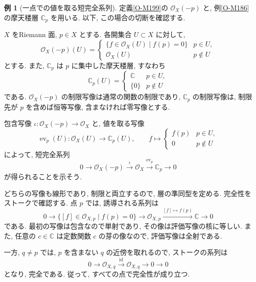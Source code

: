 \documentclass[dvipdfmx,a4paper,11pt]{article} %
\newcommand{\C}{\mathbb{C}}
\theoremstyle{definition}
\numberwithin{equation}{section}
\newtheorem{exa}[thm]{例}
\begin{document}
\begin{exa}[一点での値を取る短完全系列]\label{exa-evaluation-sequence}
定義\ref{O-M199}の $\mathcal O_X(-p)$ と, 例\ref{O-M186}の摩天楼層 $\C_p$ を用いる. 以下, この場合の切断を確認する.

$X$ をRiemann 面, $p\in X$ とする.
各開集合 $U\subset X$ に対して, 
\[
\mathcal O_X(-p)(U)=
\begin{cases}
\{f\in\mathcal O_X(U)\mid f(p)=0\} & p\in U,\\
\mathcal O_X(U) & p\notin U
\end{cases}
\]
とする.
また, $\C_p$ は $p$ に集中した摩天楼層, すなわち
\[
\C_p(U)=
\begin{cases}
\C & p\in U,\\
\{0\} & p\notin U
\end{cases}
\]
である.
$\mathcal O_X(-p)$ の制限写像は通常の関数の制限であり, 
$\C_p$ の制限写像は, 制限先が $p$ を含めば恒等写像, 
含まなければ零写像とする.

包含写像 $\iota:\mathcal O_X(-p)\to\mathcal O_X$ と, 
値を取る写像
\[
\operatorname{ev}_p(U):\mathcal O_X(U)\longrightarrow\C_p(U),
\qquad
f\longmapsto
\begin{cases}
f(p) & p\in U,\\
0 & p\notin U
\end{cases}
\]
によって, 短完全系列
\[
0\longrightarrow\mathcal O_X(-p)
\xrightarrow{\iota}\mathcal O_X
\xrightarrow{\operatorname{ev}_p}\C_p
\longrightarrow0
\]
が得られることを示そう. 

どちらの写像も線形であり, 制限と両立するので, 
層の準同型を定める.
完全性をストークで確認する.
点 $p$ では, 誘導される系列は
\[
0\longrightarrow
\{[f]\in\mathcal O_{X,p}\mid f(p)=0\}
\longrightarrow\mathcal O_{X,p}
\xrightarrow{[f]\mapsto f(p)}\C
\longrightarrow0
\]
である.
最初の写像は包含なので単射であり, その像は評価写像の核に等しい.
また, 任意の $c\in\C$ は定数関数 $c$ の芽の像なので, 
評価写像は全射である.

一方, $q\neq p$ では, $p$ を含まない $q$ の近傍を取れるので, 
ストークの系列は
\[
0\longrightarrow\mathcal O_{X,q}
\xrightarrow{\mathrm{id}}\mathcal O_{X,q}
\longrightarrow0\longrightarrow0
\]
となり, 完全である.
従って, すべての点で完全性が成り立つ.
\end{exa}
\end{document}
